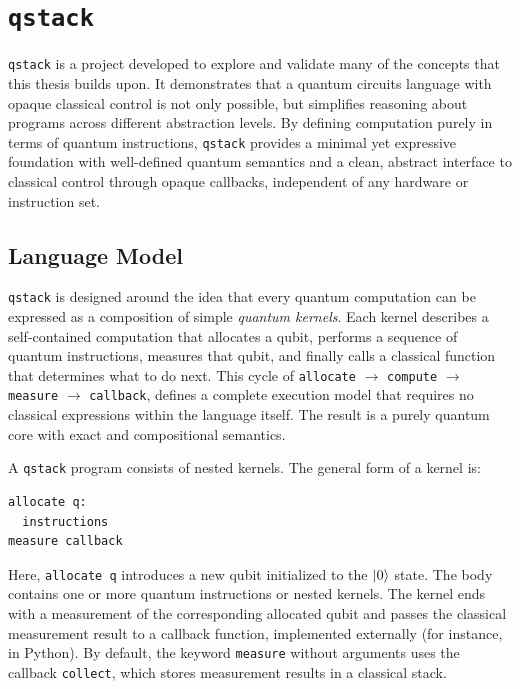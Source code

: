 \section{\texttt{qstack}}
\label{sec:qstack}

\newcommand{\keval}{\Rightarrow }
\newcommand{\qeval}{\mapsto_q }
\newcommand{\ceval}{\mapsto_c }

\texttt{qstack} is a project developed to explore and validate many of the concepts that this thesis builds upon. 
It demonstrates that a quantum circuits language with opaque classical control is not only possible, but simplifies reasoning about programs across different abstraction levels. 
By defining computation purely in terms of quantum instructions, \texttt{qstack} provides a minimal yet expressive foundation with well-defined quantum semantics and a clean, abstract interface to classical control through opaque callbacks, independent of any hardware or instruction set.


\subsection{Language Model}

\texttt{qstack} is designed around the idea that every quantum computation can be expressed as a composition of simple \emph{quantum kernels}. 
Each kernel describes a self-contained computation that allocates a qubit, performs a sequence of quantum instructions, measures that qubit, and finally calls a classical function that determines what to do next. 
This cycle  of \texttt{allocate} $\rightarrow$ \texttt{compute} $\rightarrow$ \texttt{measure} $\rightarrow$ \texttt{callback}, defines a complete execution model that requires no classical expressions within the language itself. 
The result is a purely quantum core with exact and compositional semantics.

A \texttt{qstack} program consists of nested kernels. 
The general form of a kernel is:

\begin{verbatim}
allocate q:
  instructions
measure callback
\end{verbatim}

Here, \texttt{allocate q} introduces a new qubit initialized to the $|0\rangle$ state. 
The body contains one or more quantum instructions or nested kernels. 
The kernel ends with a measurement of the corresponding allocated qubit and passes the classical measurement result to a callback function, implemented externally (for instance, in Python). 
By default, the keyword \texttt{measure} without arguments uses the callback \texttt{collect}, which stores measurement results in a classical stack. 

